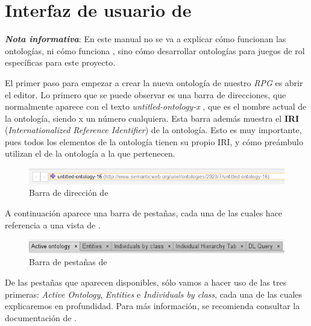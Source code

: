 
\newpage
\section{Interfaz de usuario de \protege}
\textit{\textbf{Nota informativa}}: En este manual no se va a explicar cómo funcionan las ontologías, 
ni cómo funciona \protege, sino cómo desarrollar ontologías para juegos de rol específicas para este proyecto. \medskip

El primer paso para empezar a crear la nueva ontología de nuestro \textit{RPG} es abrir el editor.
Lo primero que se puede observar es una barra de direcciones, que normalmente aparece con el texto
\textit{untitled-ontology-x }, que es el nombre actual de la ontología, siendo x un número cualquiera. 
Esta barra además muestra el \textbf{IRI} (\textit{Internationalized Reference Identifier}) de la ontología. 
Esto es muy importante, pues todos los elementos de la ontología tienen 
su propio IRI, y cómo preámbulo utilizan el de la ontología a la que pertenecen. \medskip

\begin{figure}[H]
    \centering
    \includegraphics[scale=0.8]{Figures/Protege/IRI_bar.png}
    \caption{Barra de dirección de \protege}
    \label{IRI_bar}
\end{figure}

A continuación aparece una barra de pestañas, cada una de las cuales hace referencia a una vista 
de \protege. \medskip
\begin{figure}[H]
    \centering
    \includegraphics[scale=0.8]{Figures/Protege/Tab_bar.png}
    \caption{Barra de pestañas de \protege}
    \label{Tab_bar}
\end{figure}

De las pestañas que aparecen disponibles, sólo vamos a hacer uso de las tres primeras: \textit{Active Ontology}, 
\textit{Entities} e \textit{Individuals by class}, cada una de las cuales explicaremos en profundidad. Para más 
información, se recomienda consultar la documentación de \protege.

